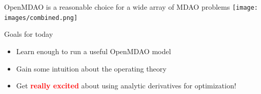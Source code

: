 \documentclass[aspectratio=169, usenames,dvipsnames, 14pt]{beamer}
\begin{document}

\begin{frame}{OpenMDAO is a reasonable choice for a wide array of MDAO problems}
        \texttt{[image: images/combined.png]}
\end{frame}


\begin{frame}{Goals for today}
    \begin{itemize}
        \item Learn enough to run a useful OpenMDAO model
        \vspace{.5cm}
        \item Gain some intuition about the operating theory
        \vspace{.5cm}
        \item Get \textcolor{red}{\textbf{really excited}} about using analytic derivatives for optimization!

    \end{itemize}
    
\end{frame}
\end{document}
